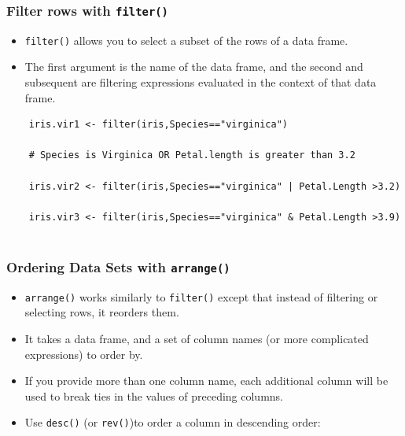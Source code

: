 \documentclass{beamer}
\begin{document}
	
\begin{frame}
\frametitle{Filter rows with \texttt{filter()}}
\begin{itemize}
\item \texttt{filter()} allows you to select a subset of the rows of a data frame. 
\item The first argument is the name of the data frame, and the second and subsequent are filtering expressions evaluated in the context of that data frame.
\end{itemize}



\end{frame}
\begin{frame}[fragile]	
\begin{framed}
\begin{verbatim}
	iris.vir1 <- filter(iris,Species=="virginica")
	
	# Species is Virginica OR Petal.length is greater than 3.2
	
	iris.vir2 <- filter(iris,Species=="virginica" | Petal.Length >3.2)
	
	iris.vir3 <- filter(iris,Species=="virginica" & Petal.Length >3.9)
	
\end{verbatim}
\end{framed}
\end{frame}
\begin{frame}
\frametitle{Ordering Data Sets with \texttt{arrange()}}
\begin{itemize}
\item \texttt{arrange()} works similarly to \texttt{filter()} except that instead of filtering or selecting rows, it reorders them. 

\item It takes a data frame, and a set of column names (or more complicated expressions) to order by.

\item If you provide more than one column name, each additional column will be used to break ties in the values of preceding columns.

\item Use \texttt{desc()} (or \texttt{rev()})to order a column in descending order:

\end{itemize}
\end{frame}
\end{document}
